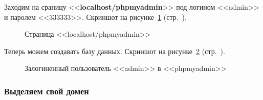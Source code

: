 Заходим на сраницу <<\textbf{localhost/phpmyadmin}>> под логином <<admin>> и паролем <<333333>>. Скриншот на рисунке~\ref{fig:make-phpmyadmin-superuser-step-6} (стр.~\pageref{fig:make-phpmyadmin-superuser-step-6}).

\begin{figure}[!htp]
    \caption{Страница <<localhost/phpmyadmin>>}
    \label{fig:make-phpmyadmin-superuser-step-6}
\end{figure}

Теперь можем создавать базу данных. Скриншот на рисунке~\ref{fig:make-phpmyadmin-superuser-step-7} (стр.~\pageref{fig:make-phpmyadmin-superuser-step-7}).

\begin{figure}[!htp]
    \caption{Залогиненный пользователь <<admin>> в <<phpmyadmin>>}
    \label{fig:make-phpmyadmin-superuser-step-7}
\end{figure}

\newpage

\subsubsection{Выделяем свой домен}

